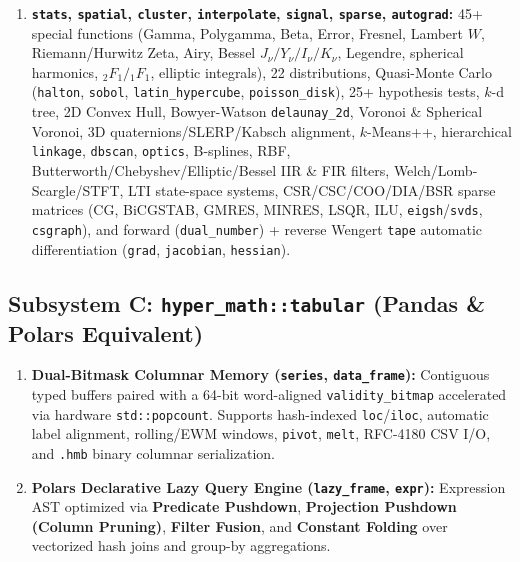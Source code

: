 \documentclass[11pt,a4paper]{article}
\begin{document}
\begin{enumerate}[leftmargin=1.5em]
  \item \textbf{\texttt{stats}, \texttt{spatial}, \texttt{cluster}, \texttt{interpolate}, \texttt{signal}, \texttt{sparse}, \texttt{autograd}:} 45+ special functions (Gamma, Polygamma, Beta, Error, Fresnel, Lambert $W$, Riemann/Hurwitz Zeta, Airy, Bessel $J_\nu/Y_\nu/I_\nu/K_\nu$, Legendre, spherical harmonics, ${}_2F_1/{}_1F_1$, elliptic integrals), 22 distributions, Quasi-Monte Carlo (\texttt{halton}, \texttt{sobol}, \texttt{latin\_hypercube}, \texttt{poisson\_disk}), 25+ hypothesis tests, $k$-d tree, 2D Convex Hull, Bowyer-Watson \texttt{delaunay\_2d}, Voronoi \& Spherical Voronoi, 3D quaternions/SLERP/Kabsch alignment, $k$-Means++, hierarchical \texttt{linkage}, \texttt{dbscan}, \texttt{optics}, B-splines, RBF, Butterworth/Chebyshev/Elliptic/Bessel IIR \& FIR filters, Welch/Lomb-Scargle/STFT, LTI state-space systems, CSR/CSC/COO/DIA/BSR sparse matrices (CG, BiCGSTAB, GMRES, MINRES, LSQR, ILU, \texttt{eigsh}/\texttt{svds}, \texttt{csgraph}), and forward (\texttt{dual\_number}) + reverse Wengert \texttt{tape} automatic differentiation (\texttt{grad}, \texttt{jacobian}, \texttt{hessian}).
\end{enumerate}

\subsection{Subsystem C: \texttt{hyper\_math::tabular} (Pandas \& Polars Equivalent)}
\begin{enumerate}[leftmargin=1.5em]
  \item \textbf{Dual-Bitmask Columnar Memory (\texttt{series}, \texttt{data\_frame}):} Contiguous typed buffers paired with a 64-bit word-aligned \texttt{validity\_bitmap} accelerated via hardware \texttt{std::popcount}. Supports hash-indexed \texttt{loc}/\texttt{iloc}, automatic label alignment, rolling/EWM windows, \texttt{pivot}, \texttt{melt}, RFC-4180 CSV I/O, and \texttt{.hmb} binary columnar serialization.
  \item \textbf{Polars Declarative Lazy Query Engine (\texttt{lazy\_frame}, \texttt{expr}):} Expression AST optimized via \textbf{Predicate Pushdown}, \textbf{Projection Pushdown (Column Pruning)}, \textbf{Filter Fusion}, and \textbf{Constant Folding} over vectorized hash joins and group-by aggregations.
\end{enumerate}

\end{document}
